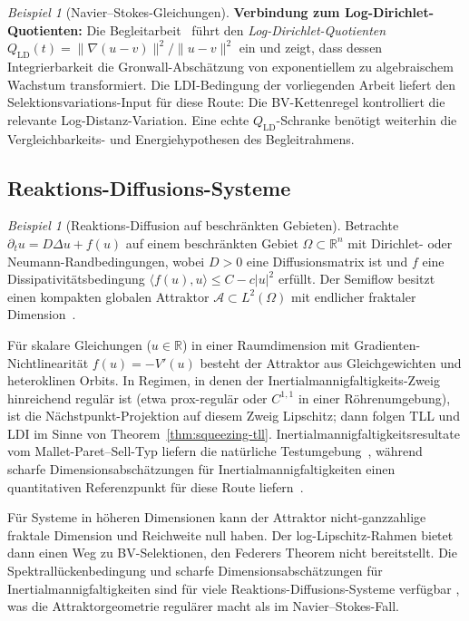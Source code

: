 \documentclass[12pt,a4paper]{article}
\theoremstyle{definition}
\theoremstyle{plain}
\theoremstyle{remark}
\newtheorem{example}[definition]{Beispiel}
\begin{document}
\begin{example}[Navier--Stokes-Gleichungen]
\medskip\noindent
\textbf{Verbindung zum Log-Dirichlet-Quotienten:}\;
Die Begleitarbeit~\cite{FST-NS2026} führt den
\emph{Log-Dirichlet-Quotienten}
$Q_{\mathrm{LD}}(t) = \|\nabla(u-v)\|^2 / \|u-v\|^2$ ein und zeigt,
dass dessen Integrierbarkeit die Gronwall-Abschätzung von
exponentiellem zu algebraischem Wachstum transformiert. Die
LDI-Bedingung der vorliegenden Arbeit liefert den
Selektionsvariations-Input für diese Route: Die BV-Kettenregel
kontrolliert die relevante Log-Distanz-Variation. Eine echte
$Q_{\mathrm{LD}}$-Schranke benötigt weiterhin die Vergleichbarkeits-
und Energiehypothesen des Begleitrahmens.
\end{example}

\subsection{Reaktions-Diffusions-Systeme}

\begin{example}[Reaktions-Diffusion auf beschränkten Gebieten]
\label{ex:RD}
Betrachte $\partial_t u = D\Delta u + f(u)$ auf einem beschränkten
Gebiet $\Omega \subset \mathbb{R}^n$ mit Dirichlet- oder
Neumann-Randbedingungen, wobei $D > 0$ eine Diffusionsmatrix ist und
$f$ eine Dissipativitätsbedingung
$\langle f(u), u \rangle \le C - c|u|^2$ erfüllt.  Der Semiflow
besitzt einen kompakten globalen Attraktor
$\mathcal{A} \subset L^2(\Omega)$ mit endlicher fraktaler
Dimension~\cite{Temam1997}.

Für skalare Gleichungen ($u \in \mathbb{R}$) in einer Raumdimension
mit Gradienten-Nichtlinearität $f(u) = -V'(u)$ besteht der
Attraktor aus Gleichgewichten und heteroklinen Orbits.  In Regimen,
in denen der Inertialmannigfaltigkeits-Zweig hinreichend regulär ist
(etwa prox-regulär oder $C^{1,1}$ in einer Röhrenumgebung), ist die
Nächstpunkt-Projektion auf diesem Zweig Lipschitz; dann folgen TLL
und LDI im Sinne von Theorem~\ref{thm:squeezing-tll}.
Inertialmannigfaltigkeitsresultate vom Mallet-Paret--Sell-Typ liefern
die natürliche Testumgebung~\cite{MalletParetSell1988}, während
scharfe Dimensionsabschätzungen für Inertialmannigfaltigkeiten einen
quantitativen Referenzpunkt für diese Route liefern~\cite{Romanov1994}.

Für Systeme in höheren Dimensionen kann der Attraktor
nicht-ganzzahlige fraktale Dimension und Reichweite null haben.
Der log-Lipschitz-Rahmen bietet dann einen Weg zu BV-Selektionen,
den Federers Theorem nicht bereitstellt.  Die Spektrallückenbedingung
und scharfe Dimensionsabschätzungen für Inertialmannigfaltigkeiten
sind für viele Reaktions-Diffusions-Systeme verfügbar
\cite{EdenFoiasNicolaenkoTemam1994},
was die Attraktorgeometrie regulärer macht als im
Navier--Stokes-Fall.
\end{example}
\end{document}
